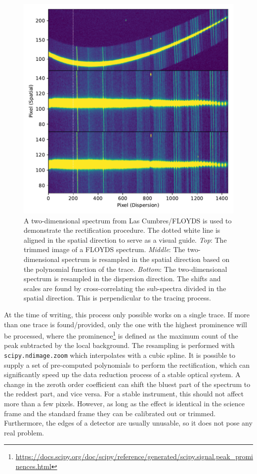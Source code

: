 \documentclass[linenumbers, twocolumn]{aastex631}
\begin{document}
\begin{figure}
    \centering
    \includegraphics[width=\columnwidth]{fig_02_rectification.pdf}
    \caption{A two-dimensional spectrum from Las Cumbres/FLOYDS is used to demonstrate
    the rectification procedure. The dotted white line is aligned in the
    spatial direction to serve as a visual guide. \textit{Top}: The trimmed image of a
    FLOYDS spectrum. \textit{Middle}: The two-dimensional spectrum is resampled in the
    spatial direction based on the polynomial function of the trace. \textit{Bottom}:
    The two-dimensional spectrum is resampled in the dispersion direction. The
    shifts and scales are found by cross-correlating the sub-spectra divided in
    the spatial direction. This is perpendicular to the tracing process.}
    \label{fig:rectify}
\end{figure}

At the time of writing, this process only possible works on a single trace. If
more than one trace is found/provided, only the one with the highest prominence
will be processed, where the 
prominence\footnote{\url{https://docs.scipy.org/doc/scipy/reference/generated/scipy.signal.peak_prominences.html}}
is defined as the maximum count of the peak subtracted by the local background. 
The resampling is performed with \texttt{scipy.ndimage.zoom} 
which interpolates with a cubic spline. It is possible to supply a set of
pre-computed polynomials to perform the rectification, which can significantly
speed up the data reduction process of a stable optical system. A change in the 
zeroth order coefficient can shift the bluest part of the spectrum to the
reddest part, and vice versa. For a stable instrument, this should not affect
more than a few pixels. However, as long as the effect is identical in the science
frame and the standard frame they can be calibrated out or trimmed. Furthermore,
the edges of a detector are usually unusable, so it does not pose any real
problem.
\end{document}
